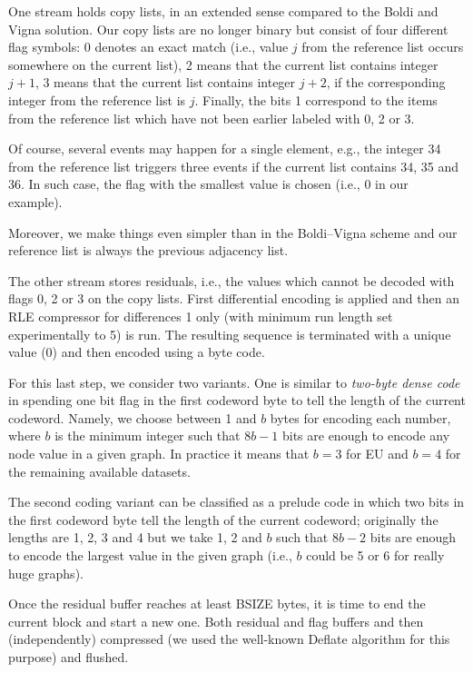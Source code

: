 \documentclass[envcountsame]{llncs}
\begin{document}
One stream holds copy lists, in an extended sense compared to the 
Boldi and Vigna solution.  Our copy lists are no longer binary but consist of 
four different flag symbols: 0 denotes an exact match (i.e., value $j$ from the 
reference list occurs somewhere on the current list), 2 means that the current list 
contains integer $j+1$, 3 means that the current list contains integer $j+2$, 
if the corresponding integer from the reference list is $j$.
Finally, the bits 1 correspond to the items from the reference list which have not 
been earlier labeled with 0, 2 or 3.

Of course, several events may happen for a single 
element, e.g., the integer 34 from the reference list triggers three events 
if the current list contains 34, 35 and 36.  In such case, the flag with the 
smallest value is chosen (i.e., 0 in our example).

Moreover, we make things even simpler than in the Boldi--Vigna scheme 
and our reference list is always the previous adjacency list.

The other stream stores residuals, i.e., the values which cannot be decoded 
with flags 0, 2 or 3 on the copy lists. First differential encoding is applied 
and then an RLE compressor for differences 1 only (with minimum run length set 
experimentally to 5) is run. The resulting sequence is terminated with a unique 
value (0) and then encoded using a byte code. 

For this last step, we consider two variants. One is similar to {\em two-byte 
dense code} \cite{DBLP:conf/iwoca/ProchazkaH09} 
in spending one bit flag in the first codeword byte to tell the length of the current 
codeword.  Namely, we choose between 1 and $b$ bytes for encoding each number, 
where $b$ is the minimum integer such that $8b - 1$ bits are enough to encode any 
node value in a given graph. In practice it means that $b = 3$ for EU and $b = 4$ for 
the remaining available datasets.

The second coding variant can be classified as a prelude 
code \cite{DBLP:conf/spire/CulpepperM05} in which two bits in the first codeword byte 
tell the length of the current codeword; originally the lengths are 1, 2, 3 and 4 
but we take 1, 2 and $b$ 
such that $8b - 2$ bits are enough to encode the 
largest value in the given graph (i.e., $b$ could be 5 or 6 for really huge graphs).

Once the residual buffer reaches at least BSIZE bytes, it is time to end the current 
block and start a new one.  Both residual and flag buffers and then (independently) 
compressed (we used the well-known Deflate algorithm for this purpose) and flushed. 
\end{document}
